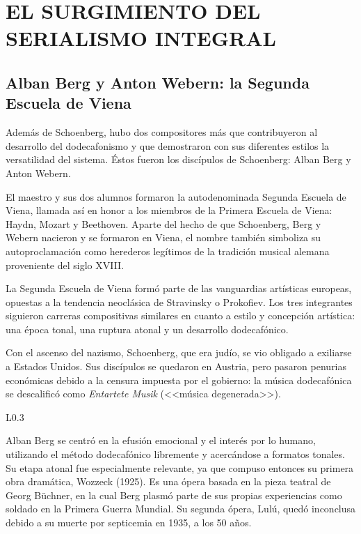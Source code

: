 \chapter{EL SURGIMIENTO DEL SERIALISMO INTEGRAL}
	\section{Alban Berg y Anton Webern: la Segunda Escuela de Viena}
	\label{berweb}
	Además de Schoenberg, hubo dos compositores más que contribuyeron al desarrollo del dodecafonismo y que demostraron con sus diferentes estilos la versatilidad del sistema. Éstos fueron los discípulos de Schoenberg: Alban Berg y Anton Webern. 
	
	El maestro y sus dos alumnos formaron la autodenominada Segunda Escuela de Viena, llamada así en honor a los miembros de la Primera Escuela de Viena: Haydn, Mozart y Beethoven. Aparte del hecho de que Schoenberg, Berg y Webern nacieron y se formaron en Viena, el nombre también simboliza su autoproclamación como herederos legítimos de la tradición musical alemana proveniente del siglo XVIII.
	
	La Segunda Escuela de Viena formó parte de las vanguardias artísticas europeas, opuestas a la tendencia neoclásica de Stravinsky o Prokofiev. Los tres integrantes siguieron carreras compositivas similares en cuanto a estilo y concepción artística: una época tonal, una ruptura atonal y un desarrollo dodecafónico.
	
	Con el ascenso del nazismo, Schoenberg, que era judío, se vio obligado a exiliarse a Estados Unidos. Sus discípulos se quedaron en Austria, pero pasaron penurias económicas debido a la censura impuesta por el gobierno: la música dodecafónica se descalificó como \emph{Entartete Musik} (<<música degenerada>>).
	
	\begin{wrapfigure}{L}{0.3\textwidth}
		\captionsetup{justification=centering, font=footnotesize}
		\vspace{-\bigskipamount}
	\end{wrapfigure}
	Alban Berg se centró en la efusión emocional y el interés por lo humano, utilizando el método dodecafónico libremente y acercándose a formatos tonales. Su etapa atonal fue especialmente relevante, ya que compuso entonces su primera obra dramática, Wozzeck (1925). Es una ópera basada en la pieza teatral de Georg Büchner, en la cual Berg plasmó parte de sus propias experiencias como soldado en la Primera Guerra Mundial. Su segunda ópera, Lulú, quedó inconclusa debido a su muerte por septicemia en 1935, a los 50 años.
	
